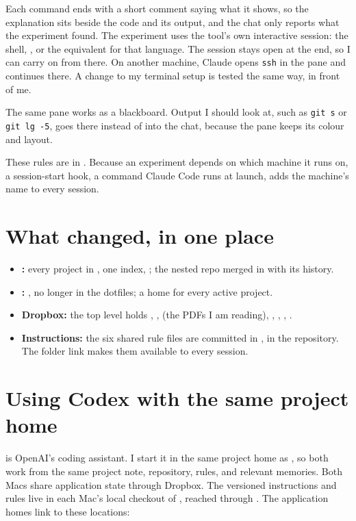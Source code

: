 \documentclass[11pt,a4paper]{article}
\newcommand{\home}{\textasciitilde}  %
\begin{document}
Each command ends with a short comment saying what it shows, so the explanation sits beside the code and its output, and the chat only reports what the experiment found. The experiment uses the tool’s own interactive session: the shell, , or the equivalent for that language. The session stays open at the end, so I can carry on from there. On another machine, Claude opens \texttt{ssh} in the pane and continues there. A change to my terminal setup is tested the same way, in front of me.

The same pane works as a blackboard. Output I should look at, such as \texttt{git s} or \texttt{git lg -5}, goes there instead of into the chat, because the pane keeps its colour and layout.

These rules are in . Because an experiment depends on which machine it runs on, a session-start hook, a command Claude Code runs at launch, adds the machine’s name to every session.

\section{What changed, in one place}

\begin{itemize}[leftmargin=1.2em]
  \item \textbf{:} every project in , one index, ; the nested repo merged in with its history.
  \item \textbf{:} \name{\home/Dropbox/Apps/PARA/}, no longer in the dotfiles; a home for every active project.
  \item \textbf{Dropbox:} the top level holds , ,  (the PDFs I am reading), , , , .
  \item \textbf{Instructions:} the six shared rule files are committed in , in the  repository. The folder link \name{\home/\lk{.claude}/\lk{rules}/} makes them available to every session.
\end{itemize}

\section{Using Codex with the same project home}

 is OpenAI's coding assistant. I start it in the same  project home as , so both work from the same project note, repository, rules, and relevant memories. Both Macs share application state through Dropbox. The versioned instructions and rules live in each Mac’s local checkout of , reached through \name{\home/.settings/}. The application homes link to these locations:
\end{document}
